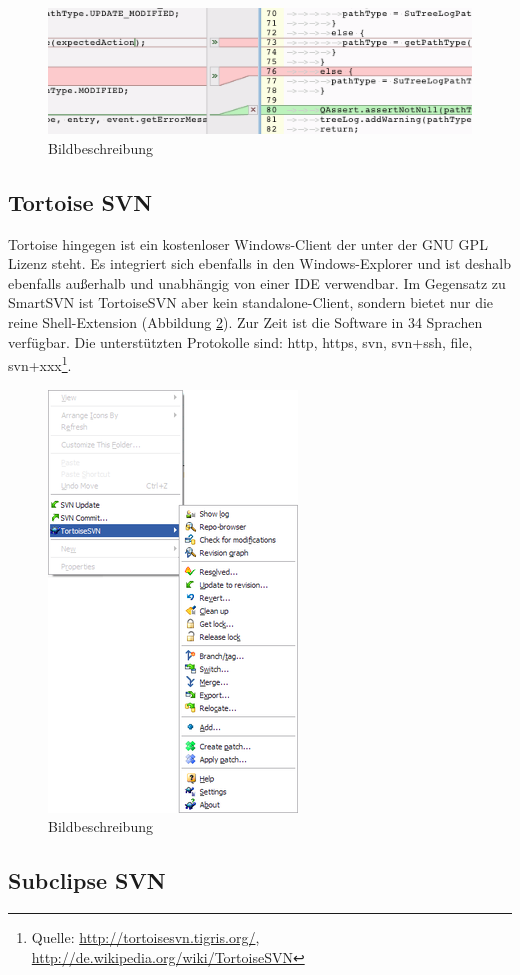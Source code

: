 \begin{figure}[!htb]
	\centering
	\includegraphics[width=.9\textwidth]{3_smartsvn3.png}
	\caption{Bildbeschreibung}
	\label{fig:smart3}
\end{figure}  
\subsection{Tortoise SVN}
Tortoise hingegen ist ein kostenloser Windows-Client der unter der GNU GPL Lizenz steht. Es integriert sich ebenfalls in den Windows-Explorer und ist deshalb ebenfalls außerhalb und unabhängig von einer IDE verwendbar. Im Gegensatz zu SmartSVN ist TortoiseSVN aber kein standalone-Client, sondern bietet nur die reine Shell-Extension (Abbildung \ref{fig:tortoise1}).
Zur Zeit ist die Software in 34 Sprachen verfügbar.
Die unterstützten Protokolle sind: http, https, svn, svn+ssh, file, svn+xxx\footnote{Quelle: \url{http://tortoisesvn.tigris.org/}, \url{http://de.wikipedia.org/wiki/TortoiseSVN}}.
\begin{figure}[!htb]
	\centering
	\includegraphics[width=.45\textwidth]{4_turtoise1.png}
	\caption{Bildbeschreibung}
	\label{fig:tortoise1}
\end{figure}  
\subsection{Subclipse SVN}
